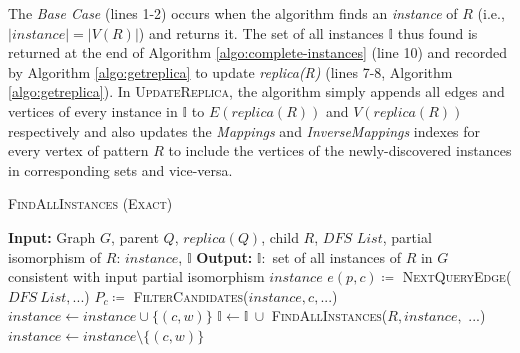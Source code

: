The \textit{Base Case} (lines 1-2) occurs when the algorithm finds an
\textit{instance} of $R$ (i.e., $|instance|=|V(R)|$) and returns it. The set of
all instances $\mathbb{I}$ thus found is returned at the end of Algorithm
\ref{algo:complete-instances} (line 10) and recorded by Algorithm
\ref{algo:getreplica} to update \textit{replica(R)} (lines 7-8, Algorithm
\ref{algo:getreplica}). In \textsc{UpdateReplica}, the algorithm simply appends
all edges and vertices of every instance in $\mathbb{I}$ to $E(replica(R))$ and
$V(replica(R))$ respectively and also updates the \textit{Mappings} and
\textit{InverseMappings} indexes for every vertex of pattern
$R$ to include the vertices of the newly-discovered instances in corresponding sets
and vice-versa.
\begin{algorithm}
	\dontprintsemicolon
	\caption{\textsc{FindAllInstances} \textsc{(Exact)}}\label{algo:complete-instances}
	\nonl \textbf{Input:} Graph $G$, parent $Q$, $replica(Q)$, child $R$, $DFS$ $List$, partial isomorphism of $R$: $instance$, $\mathbb{I}$\;
	\nonl \textbf{Output:} $\mathbb{I}: $ set of all instances of $R$ in $G$ consistent with input partial isomorphism $instance$\;
	{
	}
	\Else
	{
		$e(p,c) \coloneq$ \textsc{NextQueryEdge($DFS\ List, ...$)}\;
		$P_{c} \coloneq$ \textsc{FilterCandidates($instance, c, ...$)}\;
		{
			$instance \leftarrow instance \cup \{(c,w)\}$\;
			$\mathbb{I} \leftarrow \mathbb{I}\ \cup$ \textsc{FindAllInstances($R,instance,$ ...)}\;
			$instance \leftarrow instance \setminus \{(c,w)\}$\;
		}
		\;
	}
\end{algorithm}

